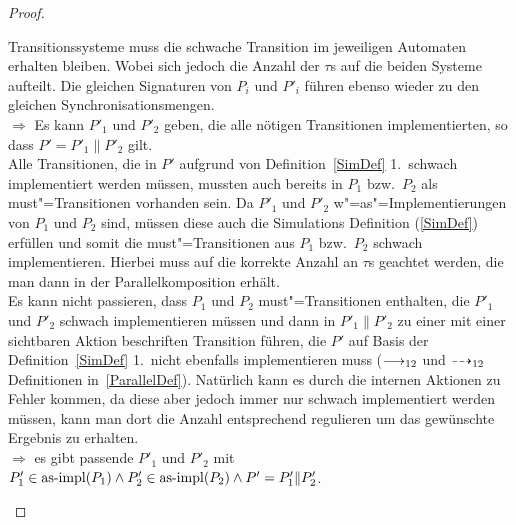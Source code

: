 \begin{proof}
\begin{enumerate}
      Transitionssysteme muss die schwache Transition im jeweiligen Automaten
      erhalten bleiben. Wobei sich jedoch die Anzahl der $\tau$s auf die beiden
      Systeme aufteilt. Die gleichen Signaturen von $P_i$ und $P'_i$ führen
      ebenso wieder zu den gleichen Synchronisationsmengen.\\
      $\Rightarrow$ Es kann $P'_1$ und $P'_2$ geben, die alle nötigen
      Transitionen implementierten, so dass $P'=P'_1\|P'_2$ gilt.\\
      Alle Transitionen, die in $P'$ aufgrund von Definition~\ref{SimDef} 1.\
      schwach implementiert werden müssen, mussten auch bereits in $P_1$ bzw.\
      $P_2$ als must"=Transitionen vorhanden sein. Da $P'_1$ und $P'_2$
      w"=as"=Implementierungen von $P_1$ und $P_2$ sind, müssen diese auch die
      Simulations Definition (\ref{SimDef}) erfüllen und somit die
      must"=Transitionen aus $P_1$ bzw.\ $P_2$ schwach implementieren. Hierbei
      muss auf die korrekte Anzahl an $\tau$s geachtet werden, die man dann in
      der Parallelkomposition erhält.\\
      Es kann nicht passieren, dass $P_1$ und $P_2$ must"=Transitionen
      enthalten, die $P'_1$ und $P'_2$ schwach implementieren müssen und dann
      in $P'_1\|P'_2$ zu einer mit einer sichtbaren Aktion beschriften
      Transition führen, die $P'$ auf Basis der Definition~\ref{SimDef} 1.\
      nicht ebenfalls implementieren muss ($\must _{12}$ und $\may _{12}$
      Definitionen in~\ref{ParallelDef}). Natürlich kann es durch die internen
      Aktionen zu Fehler kommen, da diese aber jedoch immer nur schwach
      implementiert werden müssen, kann man dort die Anzahl entsprechend
      regulieren um das gewünschte Ergebnis zu erhalten.\\
      $\Rightarrow$ es gibt passende $P'_1$ und $P'_2$ mit $P'_1\in\mathrm{as}\text{-}\mathrm{impl} (P_1)
      \land P'_2\in\mathrm{as}\text{-}\mathrm{impl} (P_2) \land P'=P'_1\|P'_2$.
  \end{enumerate}
\end{proof}
